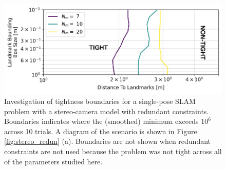 \documentclass[lettersize,journal]{IEEEtran}
\newcommand{\rev}[1]{\color{red}{#1}\color{black}}
\begin{document}
\rev{
We note that although the redundant constraints are capable of tightening the problem, the runtime of these problems is prohibitive for real-time application. This is due to the size of the problem: for a single pose problem with 20 landmarks the dimension of the SDP variable is $133$ and the number of constraints required is $3343$. These numbers also increase quite rapidly as the number of poses increases. 
}
\begin{figure}[!h]
	\centering
	\includegraphics[width=\columnwidth]{figs/slam_lms_redun}
	\caption{Investigation of tightness boundaries for a single-pose SLAM problem with a stereo-camera model with redundant constraints. Boundaries indicates where the (smoothed) minimum \rev{ER } exceeds $ 10^{6}$ across 10 trials. A diagram of the scenario is shown in Figure \ref{fig:stereo_redun} (a). Boundaries are not shown when redundant constraints are not used because the problem was not tight across all of the parameters studied here.}
	\label{fig:stereo_slam_redun}
\end{figure}
\end{document}
